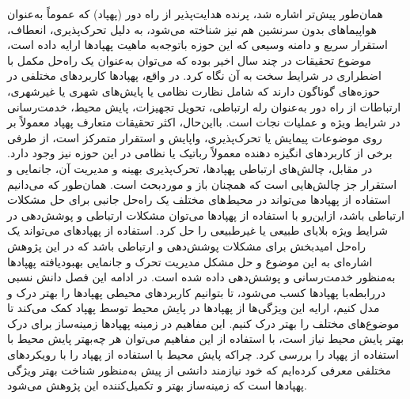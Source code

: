همان‌طور پیش‌تر اشاره شد، پرنده هدایت‌پذیر از راه دور (پهپاد) که عموماً به‌عنوان هواپیماهای بدون سرنشین هم نیز شناخته می‌شود، به دلیل تحرک‌پذیری، انعطاف، استقرار سریع و دامنه وسیعی که این حوزه باتوجه‌به ماهیت پهپادها ارایه داده است، موضوع تحقیقات در چند سال اخیر بوده که می‌توان به‌عنوان یک راه‌حل مکمل با اضطراری در شرایط سخت به آن نگاه کرد.
در واقع، پهپادها کاربردهای مختلفی در حوزه‌های گوناگون دارند که شامل نظارت نظامی یا پایش‌های شهری یا غیرشهری، ارتباطات از راه دور به‌عنوان رله ارتباطی، تحویل تجهیزات، پایش محیط، خدمت‌رسانی در شرایط ویژه و عملیات نجات است. بااین‌حال، اکثر تحقیقات متعارف پهپاد معمولاً بر روی موضوعات پیمایش یا تحرک‌پذیری، واپایش و استقرار متمرکز است، از طرفی برخی از کاربردهای انگیزه دهنده معمولاً رباتیک یا نظامی در این حوزه نیز وجود دارد. در مقابل، چالش‌های ارتباطی پهپادها، تحرک‌پذیری بهینه و مدیریت آن، جانمایی و استقرار جز چالش‌هایی است که همچنان باز و موردبحث است.
همان‌طور که می‌دانیم استفاده از پهپادها می‌تواند در محیط‌های مختلف یک راه‌حل جانبی برای حل مشکلات ارتباطی باشد، ازاین‌رو با استفاده از پهپادها می‌توان مشکلات ارتباطی و پوشش‌دهی در شرایط ویژه بلایای طبیعی یا غیرطبیعی را حل کرد. استفاده از پهپادهای می‌تواند یک راه‌حل امیدبخش برای مشکلات پوشش‌دهی و ارتباطی باشد که در این پژوهش اشاره‌ای به این موضوع و حل مشکل مدیریت تحرک و جانمایی بهبودیافته پهپادها به‌منظور خدمت‌رسانی و پوشش‌دهی داده شده است.
در ادامه این فصل دانش نسبی دررابطه‌با پهپادها کسب می‌شود، تا بتوانیم کاربردهای محیطی پهپادها را بهتر درک و مدل کنیم، ارایه این ویژگی‌ها از پهپادها در پایش محیط توسط پهپاد کمک می‌کند تا موضوع‌های مختلف را بهتر درک کنیم. این مفاهیم در زمینه پهپادها زمینه‌ساز برای درک بهتر پایش محیط نیاز است، با استفاده از این مفاهیم می‌توان هر چه‌بهتر پایش محیط با استفاده از پهپاد را بررسی کرد. چراکه پایش محیط با استفاده از پهپاد را با رویکردهای مختلفی معرفی کرده‌ایم که خود نیازمند دانشی از پیش به‌منظور شناخت بهتر ویژگی پهپادها است که زمینه‌ساز بهتر و تکمیل‌کننده این پژوهش می‌شود.
